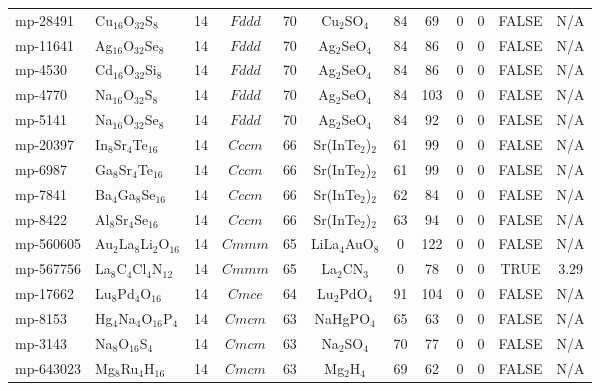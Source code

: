 {\begin{longtable}{llcccccccccc}
    mp-28491 & Cu$_{16}$O$_{32}$S$_{8}$ & 14    & $Fddd$ & 70    & Cu$_{2}$SO$_{4}$ & 84    & 69    & 0     & 0     & FALSE & N/A \\
    mp-11641 & Ag$_{16}$O$_{32}$Se$_{8}$ & 14    & $Fddd$ & 70    & Ag$_{2}$SeO$_{4}$ & 84    & 86    & 0     & 0     & FALSE & N/A \\
    mp-4530 & Cd$_{16}$O$_{32}$Si$_{8}$ & 14    & $Fddd$ & 70    & Ag$_{2}$SeO$_{4}$ & 84    & 86    & 0     & 0     & FALSE & N/A \\
    mp-4770 & Na$_{16}$O$_{32}$S$_{8}$ & 14    & $Fddd$ & 70    & Ag$_{2}$SeO$_{4}$ & 84    & 103   & 0     & 0     & FALSE & N/A \\
    mp-5141 & Na$_{16}$O$_{32}$Se$_{8}$ & 14    & $Fddd$ & 70    & Ag$_{2}$SeO$_{4}$ & 84    & 92    & 0     & 0     & FALSE & N/A \\
    mp-20397 & In$_{8}$Sr$_{4}$Te$_{16}$ & 14    & $Cccm$ & 66    & Sr(InTe$_{2}$)$_{2}$ & 61    & 99    & 0     & 0     & FALSE & N/A \\
    mp-6987 & Ga$_{8}$Sr$_{4}$Te$_{16}$ & 14    & $Cccm$ & 66    & Sr(InTe$_{2}$)$_{2}$ & 61    & 99    & 0     & 0     & FALSE & N/A \\
    mp-7841 & Ba$_{4}$Ga$_{8}$Se$_{16}$ & 14    & $Cccm$ & 66    & Sr(InTe$_{2}$)$_{2}$ & 62    & 84    & 0     & 0     & FALSE & N/A \\
    mp-8422 & Al$_{8}$Sr$_{4}$Se$_{16}$ & 14    & $Cccm$ & 66    & Sr(InTe$_{2}$)$_{2}$ & 63    & 94    & 0     & 0     & FALSE & N/A \\
    mp-560605 & Au$_{2}$La$_{8}$Li$_{2}$O$_{16}$ & 14    & $Cmmm$ & 65    & LiLa$_{4}$AuO$_{8}$ & 0     & 122   & 0     & 0     & FALSE & N/A \\
    mp-567756 & La$_{8}$C$_{4}$Cl$_{4}$N$_{12}$ & 14    & $Cmmm$ & 65    & La$_{2}$CN$_{3}$ & 0     & 78    & 0     & 0     & TRUE  & 3.29  \\
    mp-17662 & Lu$_{8}$Pd$_{4}$O$_{16}$ & 14    & $Cmce$ & 64    & Lu$_{2}$PdO$_{4}$ & 91    & 104   & 0     & 0     & FALSE & N/A \\
    mp-8153 & Hg$_{4}$Na$_{4}$O$_{16}$P$_{4}$ & 14    & $Cmcm$ & 63    & NaHgPO$_{4}$ & 65    & 63    & 0     & 0     & FALSE & N/A \\
    mp-3143 & Na$_{8}$O$_{16}$S$_{4}$ & 14    & $Cmcm$ & 63    & Na$_{2}$SO$_{4}$ & 70    & 77    & 0     & 0     & FALSE & N/A \\
    mp-643023 & Mg$_{8}$Ru$_{4}$H$_{16}$ & 14    & $Cmcm$ & 63    & Mg$_{2}$H$_{4}$ & 69    & 62    & 0     & 0     & FALSE & N/A \\

\end{longtable}}

